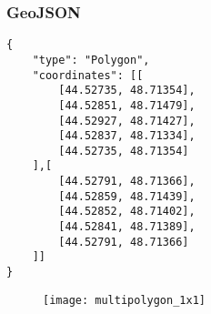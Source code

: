 \begin{frame}[fragile]
    \frametitle{GeoJSON}
    \begin{minipage}[h]{0.49\textwidth}
        \begin{lstlisting}
{
    "type": "Polygon",
    "coordinates": [[
        [44.52735, 48.71354],
        [44.52851, 48.71479],
        [44.52927, 48.71427],
        [44.52837, 48.71334],
        [44.52735, 48.71354]
    ],[
        [44.52791, 48.71366],
        [44.52859, 48.71439],
        [44.52852, 48.71402],
        [44.52841, 48.71389],
        [44.52791, 48.71366]
    ]]
}
        \end{lstlisting}
    \end{minipage}
    \begin{minipage}[h]{0.49\textwidth}
        \begin{figure}[ht!]
            \center
            \texttt{[image: multipolygon\_1x1]}
        \end{figure}
    \end{minipage}
\end{frame}